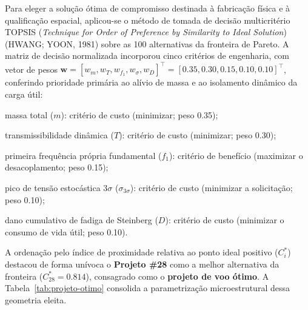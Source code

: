 Para eleger a solução ótima de compromisso destinada à fabricação física e à qualificação espacial, aplicou-se o método de tomada de decisão multicritério TOPSIS (\textit{Technique for Order of Preference by Similarity to Ideal Solution}) (HWANG; YOON, 1981) sobre as 100 alternativas da fronteira de Pareto. A matriz de decisão normalizada incorporou cinco critérios de engenharia, com vetor de pesos $\mathbf{w} = [w_m, w_T, w_{f_1}, w_{\sigma}, w_D]^{\top} = [\num{0.35}, \num{0.30}, \num{0.15}, \num{0.10}, \num{0.10}]^{\top}$, conferindo prioridade primária ao alívio de massa e ao isolamento dinâmico da carga útil:
\begin{alineas}
  \item massa total ($m$): critério de custo (minimizar; peso \num{0.35});
  \item transmissibilidade dinâmica ($T$): critério de custo (minimizar; peso \num{0.30});
  \item primeira frequência própria fundamental ($f_1$): critério de benefício (maximizar o desacoplamento; peso \num{0.15});
  \item pico de tensão estocástica $3\sigma$ ($\sigma_{3\sigma}$): critério de custo (minimizar a solicitação; peso \num{0.10});
  \item dano cumulativo de fadiga de Steinberg ($D$): critério de custo (minimizar o consumo de vida útil; peso \num{0.10}).
\end{alineas}

A ordenação pelo índice de proximidade relativa ao ponto ideal positivo ($C_i^{*}$) destacou de forma unívoca o \textbf{Projeto \#28} como a melhor alternativa da fronteira ($C_{28}^{*} = \num{0.814}$), consagrado como o \textbf{projeto de voo ótimo}. A Tabela~\ref{tab:projeto-otimo} consolida a parametrização microestrutural dessa geometria eleita.

